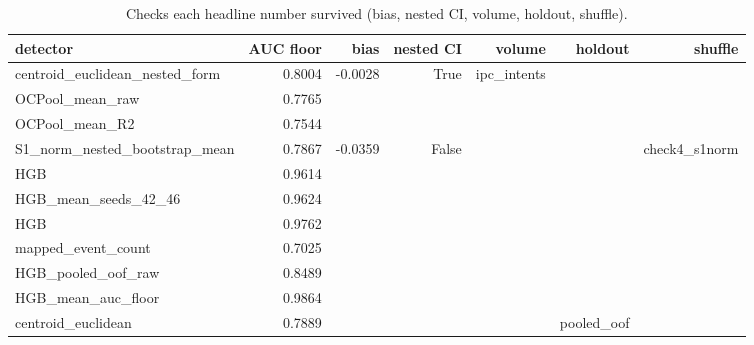 \begin{table}[ht]
\centering
\caption{Checks each headline number survived (bias, nested CI, volume, holdout, shuffle).}
\label{tab:t8-val}
\begin{tabular}{lrrrrrr}
\toprule
detector & AUC floor & bias & nested CI & volume & holdout & shuffle \\
\midrule
centroid\_euclidean\_nested\_form & 0.8004 & -0.0028 & True & ipc\_intents &  &  \\
OCPool\_mean\_raw & 0.7765 &  &  &  &  &  \\
OCPool\_mean\_R2 & 0.7544 &  &  &  &  &  \\
S1\_norm\_nested\_bootstrap\_mean & 0.7867 & -0.0359 & False &  &  & check4\_s1norm \\
HGB & 0.9614 &  &  &  &  &  \\
HGB\_mean\_seeds\_42\_46 & 0.9624 &  &  &  &  &  \\
HGB & 0.9762 &  &  &  &  &  \\
mapped\_event\_count & 0.7025 &  &  &  &  &  \\
HGB\_pooled\_oof\_raw & 0.8489 &  &  &  &  &  \\
HGB\_mean\_auc\_floor & 0.9864 &  &  &  &  &  \\
centroid\_euclidean & 0.7889 &  &  &  & pooled\_oof &  \\
\bottomrule
\end{tabular}
\end{table}
